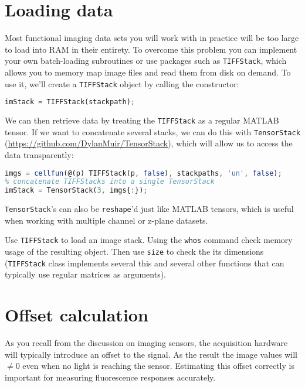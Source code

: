 \documentclass[a4paper]{report}
\newcommand{\nexercise}[0]{\arabic{exercises}\addtocounter{exercises}{1}}
\begin{document}
\section{Loading data}
Most functional imaging data sets you will work with in practice will be too large to load into RAM in their entirety. 
To overcome this problem you can implement your own batch-loading subroutines or use packages such as \texttt{TIFFStack}, which allows you to memory map image files and read them from disk on demand. 
To use it, we'll create a \texttt{TIFFStack} object by calling the constructor:
\begin{lstlisting}[language=Octave]
imStack = TIFFStack(stackpath);
\end{lstlisting}
We can then retrieve data by treating the \texttt{TIFFStack} as a regular MATLAB tensor.
If we want to concatenate several stacks, we can do this with \texttt{TensorStack} (\href{https://github.com/DylanMuir/TensorStack}{https://github.com/DylanMuir/TensorStack}), which will allow us to access the data transparently:
\begin{lstlisting}[language=Octave]
% create a TIFFStack for each file
imgs = cellfun(@(p) TIFFStack(p, false), stackpaths, 'un', false);
% concatenate TIFFStacks into a single TensorStack
imStack = TensorStack(3, imgs{:});
\end{lstlisting}

\texttt{TensorStack}'s can also be \texttt{reshape}'d just like MATLAB tensors, which is useful when working with multiple channel or z-plane datasets.

\begin{exercisebox}[frametitle={Exercise \nexercise: Using \texttt{TIFFStack} to memory map image data}]
Use \texttt{TIFFStack} to load an image stack. Using the \texttt{whos} command check memory usage of the resulting object. 
Then use \texttt{size} to check the its dimensions (\texttt{TIFFStack} class implements several this and several other functions that can typically use regular matrices as arguments). 
\end{exercisebox}

\section{Offset calculation}
As you recall from the discussion on imaging sensors, the acquisition hardware will typically introduce an offset to the signal. 
As the result the image values will $\neq 0$ even when no light is reaching the sensor. 
Estimating this offset correctly is important for measuring fluorescence responses accurately. 
\end{document}

